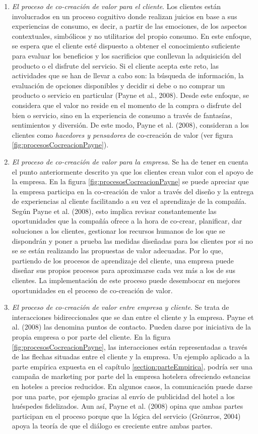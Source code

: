 \begin{enumerate} 
	\item \emph{El proceso de co-creación de valor para el cliente}. Los clientes están involucrados en un proceso cognitivo donde realizan juicios en base a sus experiencias de consumo, es decir, a partir de las emociones, de los aspectos contextuales, simbólicos y no utilitarios del propio consumo. En este enfoque, se espera que el cliente esté dispuesto a obtener el conocimiento suficiente para evaluar los beneficios y los sacrificios que conllevan la adquisición del producto o el disfrute del servicio. Si el cliente acepta este reto, las actividades que se han de llevar a cabo son: la búsqueda de información, la evaluación de opciones disponibles y decidir si debe o no comprar un producto o servicio en particular (Payne et al., 2008). Desde este enfoque, se considera que el valor no reside en el momento de la compra o disfrute del bien o servicio, sino en la experiencia de consumo a través de fantasías, sentimientos y diversión. De este modo, Payne et al. (2008), consideran a los clientes como \emph{hacedores y pensadores} de co-creación de valor (ver figura \ref{fig:procesosCocreacionPayne}).
	\item \emph{El proceso de co-creación de valor para la empresa}. Se ha de tener en cuenta el punto anteriormente descrito ya que los clientes crean valor con el apoyo de la empresa. En la figura \ref{fig:procesosCocreacionPayne} se puede apreciar que la empresa participa en la co-creación de valor a través del diseño y la entrega de experiencias al cliente facilitando a su vez el aprendizaje de la compañía. Según Payne et al. (2008), esto implica revisar constantemente las oportunidades que la compañía ofrece a la hora de co-crear, planificar, dar soluciones a los clientes, gestionar los recursos humanos de los que se dispondrán y poner a prueba las medidas diseñadas para los clientes por si no se se están realizando las propuestas de valor adecuadas. Por lo que, partiendo de los procesos de aprendizaje del cliente, una empresa puede diseñar sus propios procesos para aproximarse cada vez más a los de sus clientes. La implementación de este proceso puede desembocar en mejores oportunidades en el proceso de co-creación de valor. 
	\item \emph{El proceso de co-creación de valor entre empresa y cliente}. Se trata de interacciones bidireccionales que se dan entre el cliente y la empresa. Payne et al. (2008) las denomina puntos de contacto. Pueden darse por iniciativa de la propia empresa o por parte del cliente. En la figura \ref{fig:procesosCocreacionPayne}, las interacciones están representadas a través de las flechas situadas entre el cliente y la empresa. Un ejemplo aplicado a la parte empírica expuesta en el capítulo \ref{section:parteEmpirica}, podría ser una campaña de marketing por parte del la empresa hotelera ofreciendo estancias en hoteles a precios reducidos. En algunos casos, la comunicación puede darse por una parte, por ejemplo gracias al envío de publicidad del hotel a los huéspedes fidelizados. Aun así, Payne et al. (2008) opina que ambas partes participan en el proceso porque que la lógica del servicio (Grönrros, 2004) apoya la teoría de que el diálogo es creciente entre ambas partes.


\end{enumerate}
